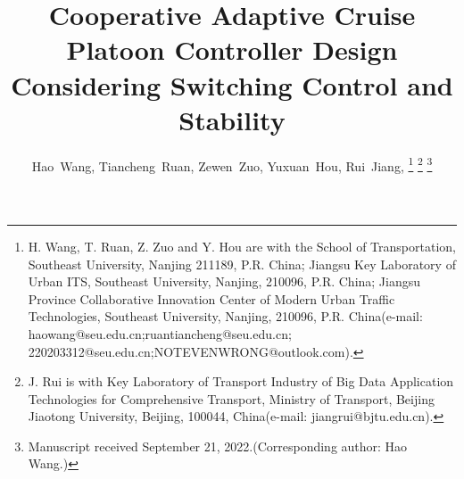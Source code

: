 \documentclass[journal]{IEEEtran}
\begin{document}
%
\title{Cooperative Adaptive Cruise Platoon Controller Design Considering Switching Control and Stability}
%
%
%

\author{Hao~Wang,
  Tiancheng~Ruan,
  Zewen~Zuo,
  Yuxuan~Hou,
  Rui~Jiang,
  \thanks{H. Wang, T. Ruan, Z. Zuo and Y. Hou are with the
    School of Transportation, Southeast University, Nanjing 211189, P.R. China;
    Jiangsu Key Laboratory of Urban ITS, Southeast University, Nanjing, 210096, P.R. China;
    Jiangsu Province Collaborative Innovation Center of Modern Urban Traffic Technologies, Southeast University, Nanjing, 210096, P.R. China(e-mail: haowang@seu.edu.cn;ruantiancheng@seu.edu.cn; 220203312@seu.edu.cn;NOTEVENWRONG@outlook.com).}%
  \thanks{J. Rui is with Key Laboratory of Transport Industry of Big Data Application Technologies for Comprehensive Transport, Ministry of Transport, Beijing Jiaotong University, Beijing, 100044,  China(e-mail: jiangrui@bjtu.edu.cn).}%
  \thanks{Manuscript received September 21, 2022.(Corresponding author: Hao Wang.)}}

% 
%
\end{document}
